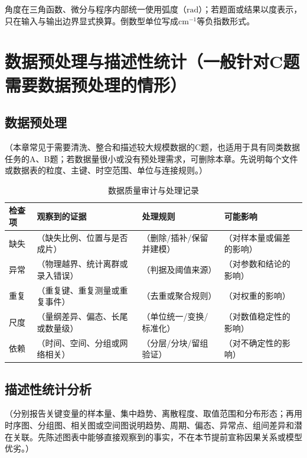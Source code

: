 \documentclass[UTF8,zihao=-4]{ctexart}
\newcommand{\fillin}[1]{（#1）}
\begin{document}
角度在三角函数、微分与程序内部统一使用弧度（$\mathrm{rad}$）；若题面或结果以度表示，只在输入与输出边界显式换算。倒数型单位写成$\mathrm{cm^{-1}}$等负指数形式。

\section{数据预处理与描述性统计（一般针对C题需要数据预处理的情形）}

\subsection{数据预处理}

\fillin{本章常见于需要清洗、整合和描述较大规模数据的C题，也适用于具有同类数据任务的A、B题；若数据量很小或没有预处理需求，可删除本章。先说明每个文件或数据表的粒度、主键、时空范围、单位与连接规则。}

\begin{table}[htbp]
  \centering
  \caption{数据质量审计与处理记录}
  \small
  \begin{tabularx}{0.96\textwidth}{C{1.6cm}LLL}
    \toprule
    检查项 & 观察到的证据 & 处理规则 & 可能影响 \\
    \midrule
    缺失 & \fillin{缺失比例、位置与是否成片} & \fillin{删除/插补/保留并建模} & \fillin{对样本量或偏差的影响} \\
    异常 & \fillin{物理越界、统计离群或录入错误} & \fillin{判据及阈值来源} & \fillin{对参数和结论的影响} \\
    重复 & \fillin{重复键、重复测量或重复事件} & \fillin{去重或聚合规则} & \fillin{对权重的影响} \\
    尺度 & \fillin{量纲差异、偏态、长尾或数量级} & \fillin{单位统一/变换/标准化} & \fillin{对数值稳定性的影响} \\
    依赖 & \fillin{时间、空间、分组或网络相关} & \fillin{分层/分块/留组验证} & \fillin{对不确定性的影响} \\
    \bottomrule
  \end{tabularx}
\end{table}

\subsection{描述性统计分析}

\fillin{分别报告关键变量的样本量、集中趋势、离散程度、取值范围和分布形态；再用时序图、分组图、相关图或空间图说明趋势、周期、偏态、异常点、组间差异和潜在关联。先陈述图表中能够直接观察到的事实，不在本节提前宣称因果关系或模型优劣。}
\end{document}
